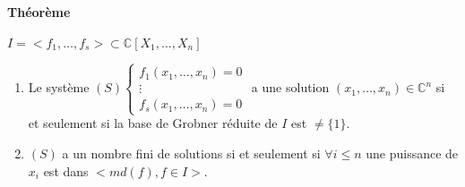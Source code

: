 \documentclass[12pt,a4paper]{report}
\begin{document}
\paragraph{Théorème\\}
$I = <f_1,\ldots,f_s> \subset \mathbb{C}[X_1,\ldots,X_n]$
\begin{enumerate}
\item Le système $ (S) \left\{\begin{array}{c}
f_1(x_1,\ldots,x_n) = 0 \\
\vdots \\
f_s(x_1,\ldots,x_n) = 0 \end{array}\right.$ a une solution $(x_1,\ldots,x_n) \in \mathbb{C}^n$ si et seulement si la base de Grobner réduite de $I$ est $\neq \{1\}$.
\item $(S)$ a un nombre fini de solutions si et seulement si $\forall i \leqslant n$ une puissance de $x_i$ est dans $< md(f),f\in I>$.
\end{enumerate}
\end{document}
